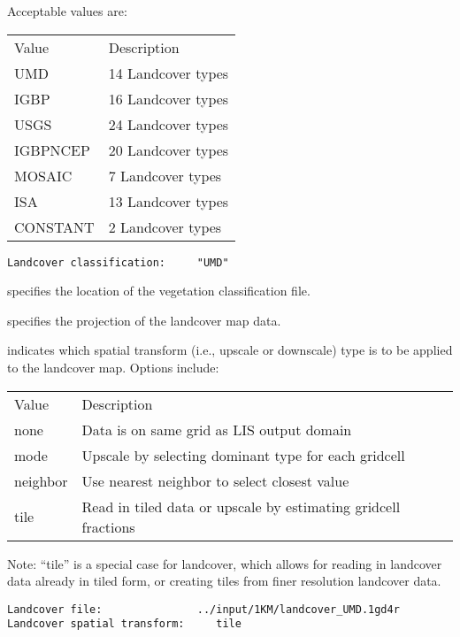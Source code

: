  Acceptable values are:

 \begin{tabular}{ll}
 Value     & Description               \\
 UMD       &  14 Landcover types       \\
 IGBP      &  16 Landcover types       \\
 USGS      &  24 Landcover types       \\
 IGBPNCEP  &  20 Landcover types       \\
 MOSAIC    &   7 Landcover types       \\
 ISA       &  13 Landcover types       \\
 CONSTANT  &   2 Landcover types       \\
 \end{tabular}
 

 \begin{Verbatim}[frame=single]
Landcover classification:     "UMD"  
 \end{Verbatim}

 
  specifies the location of the vegetation
 classification file.

  specifies the projection of the
 landcover map data.

  indicates which spatial transform
 (i.e., upscale or downscale) type is to be applied to the landcover
 map.  Options include:

 \begin{tabular}{ll}
 Value & Description                                          \\
 none  & Data is on same grid as LIS output domain            \\
 mode  & Upscale by selecting dominant type for each gridcell \\
 neighbor &  Use nearest neighbor to select closest value  \\
 tile  & Read in tiled data or upscale by estimating gridcell fractions\\
 \end{tabular}
 Note: ``tile'' is a special case for landcover, which allows
 for reading in landcover data already in tiled form, or creating
 tiles from finer resolution landcover data.
 

 \begin{Verbatim}[frame=single]
Landcover file:               ../input/1KM/landcover_UMD.1gd4r
Landcover spatial transform:     tile
 \end{Verbatim}


